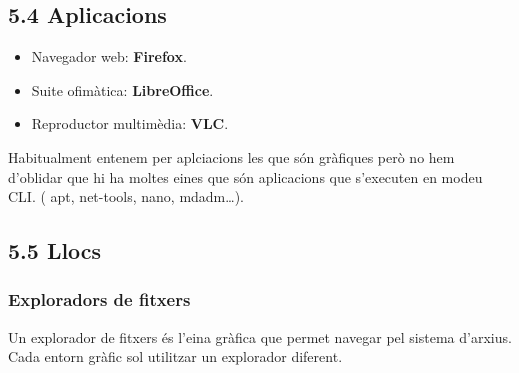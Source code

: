 \documentclass[
  a4paper,
]{article}
\providecommand{\tightlist}{%
  \setlength{\itemsep}{0pt}\setlength{\parskip}{0pt}}
\begin{document}
\subsection{5.4 Aplicacions}\label{aplicacions}

\begin{itemize}
\tightlist
\item
  Navegador web: \textbf{Firefox}.
\item
  Suite ofimàtica: \textbf{LibreOffice}.
\item
  Reproductor multimèdia: \textbf{VLC}.
\end{itemize}

Habitualment entenem per aplciacions les que són gràfiques però no hem
d'oblidar que hi ha moltes eines que són aplicacions que s'executen en
modeu CLI. ( apt, net-tools, nano, mdadm\ldots).

\subsection{5.5 Llocs}\label{llocs}

\subsubsection{Exploradors de fitxers}\label{exploradors-de-fitxers}

Un explorador de fitxers és l'eina gràfica que permet navegar pel
sistema d'arxius. Cada entorn gràfic sol utilitzar un explorador
diferent.
\end{document}
